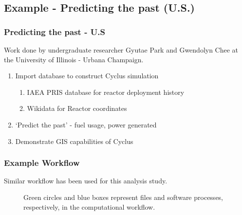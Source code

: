 \subsection{Example - Predicting the past (U.S.)}

\begin{frame}
    \frametitle{Predicting the past - U.S}
    Work done by undergraduate researcher Gyutae Park and Gwendolyn Chee at the University of Illinois - Urbana Champaign.
    \begin{enumerate}
        \item Import database to construct Cyclus simulation
        \begin{enumerate}
            \item IAEA PRIS database for reactor deployment history
            \item Wikidata for Reactor coordinates
        \end{enumerate}
        \item `Predict the past' - fuel usage, power generated
        \item Demonstrate GIS capabilities of Cyclus
    \end{enumerate}
\end{frame}


\begin{frame}
    \frametitle{Example Workflow}
    Similar workflow has been used for this analysis study.
\begin{figure}
\caption{Green circles and blue boxes represent files and software 
processes, respectively, in the computational workflow.}
\label{diag:comp}
\end{figure}

\end{frame}

